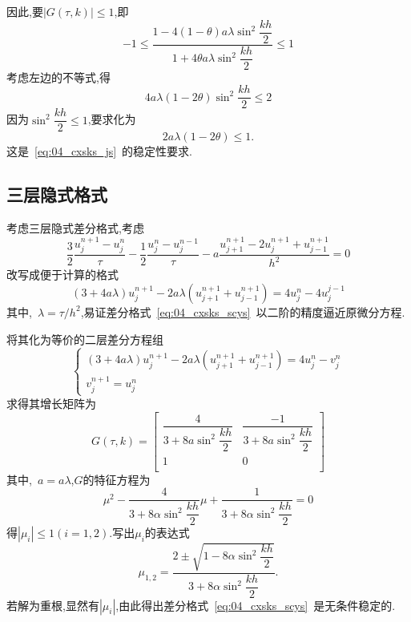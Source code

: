 因此,要$|G(\tau,k)|\leq 1$,即
\begin{equation*}
 -1\leq\dfrac{1-4(1-\theta)a\lambda\sin^2\dfrac{kh}{2}}{1+4\theta a\lambda\sin^2\dfrac{kh}{2}}\leq 1
\end{equation*}
考虑左边的不等式,得
\begin{equation*}
4a\lambda(1-2\theta)\sin^2\dfrac{kh}{2}\leq2
\end{equation*}
因为$\sin^2\dfrac{kh}{2}\leq 1$,要求化为
\begin{equation}
 2a\lambda(1-2\theta)\leq 1.
\end{equation}
这是~\ref{eq:04_cxsks_js}~的稳定性要求.
\subsection{三层隐式格式}
考虑三层隐式差分格式,考虑
\begin{equation}\label{eq:04_cxsks_scys}
\dfrac{3}{2}\dfrac{u_j^{n+1}-u_j^n}{\tau}-\dfrac{1}{2}\dfrac{u_j^n-u_j^{n-1}}{\tau}
-a\dfrac{u_{j+1}^{n+1}-2u_{j}^{n+1}+u_{j-1}^{n+1}}{h^2}=0
\end{equation}
改写成便于计算的格式
\begin{equation}
 (3+4a\lambda)u_j^{n+1}-2a\lambda(u_{j+1}^{n+1}+u_{j-1}^{n+1})=4u_j^n-4u_j^{j-1}
\end{equation}
其中,~$\lambda=\tau/h^2$,易证差分格式~\ref{eq:04_cxsks_scys}~以二阶的精度逼近原微分方程.\par
将其化为等价的二层差分方程组
\begin{equation*}
\begin{cases}
(3+4a\lambda)u_j^{n+1}-2a\lambda(u_{j+1}^{n+1}+u_{j-1}^{n+1})=4u_j^n-v_j^n \\
v_j^{n+1}=u_j^n
\end{cases}
\end{equation*}
求得其增长矩阵为
\begin{equation*}
 G(\tau,k)=\begin{bmatrix}
  \dfrac{4}{3+8a\sin^2\dfrac{kh}{2}} & \dfrac{-1}{3+8a\sin^2\dfrac{kh}{2}} \\
                     1		     &			0		   \\
 \end{bmatrix}
\end{equation*}
其中,~$a=a\lambda$,$G$的特征方程为
\begin{equation*}
 \mu^2-\dfrac{4}{3+8\alpha\sin^2\dfrac{kh}{2}}\mu+\dfrac{1}{3+8\alpha\sin^2\dfrac{kh}{2}}=0
\end{equation*}
得$|\mu_i|\leq1(i=1,2)$.写出$\mu_i$的表达式
\begin{equation*}
\mu_{1,2}=\dfrac{2\pm\sqrt{1-8\alpha\sin^2\dfrac{kh}{2}}}{3+8\alpha\sin^2\dfrac{kh}{2}}.
\end{equation*}
若解为重根,显然有$|\mu_i|$,由此得出差分格式~\ref{eq:04_cxsks_scys}~是无条件稳定的.
